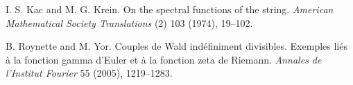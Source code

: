  I. S. Kac and M. G. Krein. On the spectral functions of the string. \emph{American Mathematical Society Translations} (2) 103 (1974), 19--102.

 B. Roynette and M. Yor. Couples de Wald ind\'efiniment divisibles. Exemples li\'es \`a la fonction gamma d'Euler et \`a la fonction zeta de Riemann. \emph{Annales de l'Institut Fourier} 55 (2005), 1219--1283.
